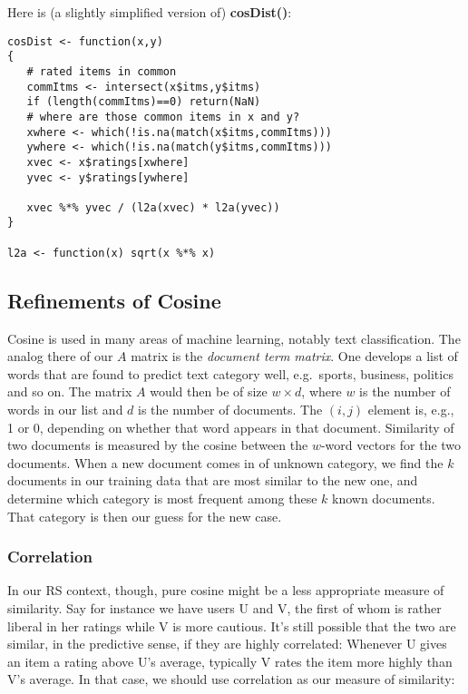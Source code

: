 Here is (a slightly simplified version of) \textbf{cosDist()}:

\begin{lstlisting}
cosDist <- function(x,y)
{
   # rated items in common
   commItms <- intersect(x$itms,y$itms)
   if (length(commItms)==0) return(NaN)
   # where are those common items in x and y?
   xwhere <- which(!is.na(match(x$itms,commItms)))
   ywhere <- which(!is.na(match(y$itms,commItms)))
   xvec <- x$ratings[xwhere]
   yvec <- y$ratings[ywhere]

   xvec %*% yvec / (l2a(xvec) * l2a(yvec))
}

l2a <- function(x) sqrt(x %*% x)

\end{lstlisting}

\subsection{Refinements of Cosine}

Cosine is used in many areas of machine learning, notably text
classification.  The analog there of our $A$ matrix is the
\textit{document term matrix}.  One develops a list of words that are
found to predict text category well, e.g.\ sports, business, politics and
so on.  The matrix $A$ would then be of size $w \times d$, where $w$ is
the number of words in our list and $d$ is the number of documents.  The
$(i,j)$ element is, e.g., 1 or 0, depending on whether that word appears
in that document.  Similarity of two documents is measured by the
cosine between the $w$-word vectors for the two documents.  When a new
document comes in of unknown category, we find the $k$ documents in our
training data that are most similar to the new one, and determine which
category is most frequent among these $k$ known documents.  That
category is then our guess for the new case.

\subsubsection{Correlation}

In our RS context, though, pure cosine might be a less appropriate
measure of similarity.  Say for instance we have users U and V, the
first of whom is rather liberal in her ratings while V is more cautious.
It's still possible that the two are similar, in the predictive sense,
if they are highly correlated:  Whenever U gives an item a rating
above U's average, typically V rates the item more highly than V's
average.  In that case, we should use correlation as our measure of
similarity:

